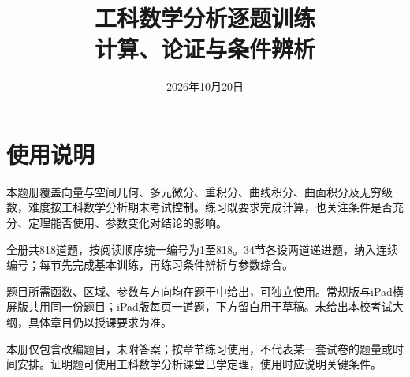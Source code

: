 \documentclass[11pt,a4paper,fontset=fandol]{ctexart}
\title{工科数学分析逐题训练\\[0.4em]\large 计算、论证与条件辨析}
\author{}
\date{2026年10月20日}
\begin{document}
\maketitle
\section*{使用说明}
本题册覆盖向量与空间几何、多元微分、重积分、曲线积分、曲面积分及无穷级数，难度按工科数学分析期末考试控制。练习既要求完成计算，也关注条件是否充分、定理能否使用、参数变化对结论的影响。

全册共818道题，按阅读顺序统一编号为1至818。34节各设两道递进题，纳入连续编号；每节先完成基本训练，再练习条件辨析与参数综合。

题目所需函数、区域、参数与方向均在题干中给出，可独立使用。常规版与iPad横屏版共用同一份题目；iPad版每页一道题，下方留白用于草稿。未给出本校考试大纲，具体章目仍以授课要求为准。

本册仅包含改编题目，未附答案；按章节练习使用，不代表某一套试卷的题量或时间安排。证明题可使用工科数学分析课堂已学定理，使用时应说明关键条件。
\tableofcontents
\clearpage

\clearpage

\clearpage

\clearpage

\clearpage

\clearpage

\end{document}
